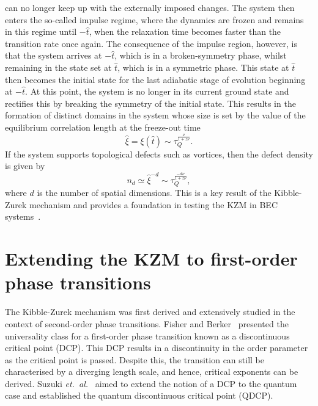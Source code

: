 can no longer keep up with the externally imposed changes.
The system then enters the so-called impulse regime, where the dynamics are
frozen and remains in this regime until \( -\hat{t} \), when the relaxation
time becomes faster than the transition rate once again.
The consequence of the impulse region, however, is that the system arrives at
\( -\hat{t} \), which is in a broken-symmetry phase, whilst remaining
in the state set at \( \hat{t} \), which is in a symmetric phase.
This state at \( \hat{t} \) then becomes the initial state for the last adiabatic
stage of evolution beginning at \( -\hat{t} \).
At this point, the system is no longer in its current ground state and rectifies
this by breaking the symmetry of the initial state.
This results in the formation of distinct domains in the system whose size is
set by the value of the equilibrium correlation length at the freeze-out time
\begin{equation}
    \hat{\xi}=\xi(\hat{t}) \sim \tau_Q^{\frac{\nu}{1 + z\nu}}.
    \label{eq: KZM-domain-size}
\end{equation}
If the system supports topological defects such as vortices, then the defect
density is given by
\begin{equation}
    n_d \simeq \hat{\xi}^{-d} \sim \tau_Q^{\frac{-d\nu}{1+z\nu}},
\end{equation}
where \( d \) is the number of spatial dimensions.
This is a key result of the Kibble-Zurek mechanism and provides a
foundation in testing the KZM in BEC systems~\cite{Damski2007, Swislocki2013,
Anquez2016, Saito2007A, Saito2007B}.

\section{Extending the KZM to first-order phase transitions}
The Kibble-Zurek mechanism was first derived and extensively studied in the
context of second-order phase transitions.
Fisher and Berker~\cite{Fisher1982} presented the universality class for
a first-order phase transition known as a discontinuous critical point (DCP).
This DCP results in a discontinuity in the order parameter as the critical point
is passed.
Despite this, the transition can still be characterised by a diverging length
scale, and hence, critical exponents can be derived.
Suzuki \textit{et.\ al.}~\cite{Suzuki2015} aimed to extend the notion of a DCP to
the quantum case and established the quantum discontinuous critical point
(QDCP).

